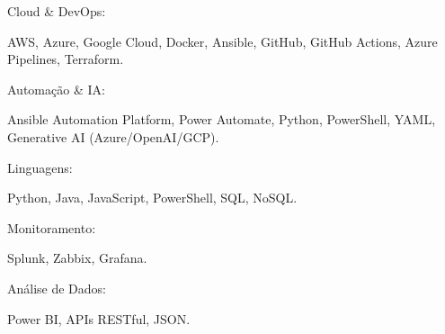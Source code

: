 

\begin{cventries}

  \cventry
    {} %
    {Cloud \& DevOps:} %
    {} %
    {} %
    {
      \begin{cvitems} %
        \item {AWS, Azure, Google Cloud, Docker, Ansible, GitHub, GitHub Actions, Azure Pipelines, Terraform.}
      \end{cvitems}
    }

  \cventry
    {} %
    {Automação \& IA:} %
    {} %
    {} %
    {
      \begin{cvitems} %
        \item {Ansible Automation Platform, Power Automate, Python, PowerShell, YAML, Generative AI (Azure/OpenAI/GCP).}
      \end{cvitems}
    }

  \cventry
    {} %
    {Linguagens:} %
    {} %
    {} %
    {
      \begin{cvitems} %
        \item {Python, Java, JavaScript, PowerShell, SQL, NoSQL.}
      \end{cvitems}
    }

  \cventry
    {} %
    {Monitoramento:} %
    {} %
    {} %
    {
      \begin{cvitems} %
        \item {Splunk, Zabbix, Grafana.}
      \end{cvitems}
    }

  \cventry
    {} %
    {Análise de Dados:} %
    {} %
    {} %
    {
      \begin{cvitems} %
        \item {Power BI, APIs RESTful, JSON.}
      \end{cvitems}
    }


\end{cventries}
